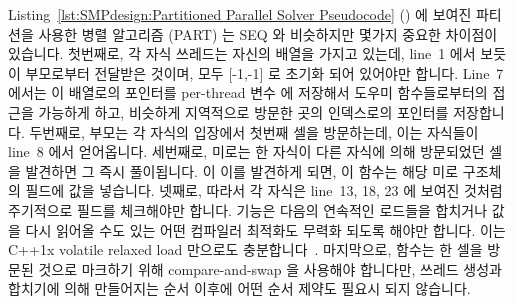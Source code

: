 Listing~\ref{lst:SMPdesign:Partitioned Parallel Solver Pseudocode}
() 에 보여진 파티션을 사용한 병렬 알고리즘 (PART) 는 SEQ 와
비슷하지만 몇가지 중요한 차이점이 있습니다.
첫번째로, 각 자식 쓰레드는 자신의  배열을 가지고 있는데, line~1
에서 보듯이 부모로부터 전달받은 것이며, 모두 [-1,-1] 로 초기화 되어 있어야만
합니다.
Line~7 에서는 이 배열로의 포인터를 per-thread 변수  에 저장해서
도우미 함수들로부터의 접근을 가능하게 하고, 비슷하게 지역적으로 방문한 곳의
인덱스로의 포인터를 저장합니다.
두번째로, 부모는 각 자식의 입장에서 첫번째 셀을 방문하는데, 이는 자식들이
line~8 에서 얻어옵니다.
세번째로, 미로는 한 자식이 다른 자식에 의해 방문되었던 셀을 발견하면 그 즉시
풀이됩니다.
 이 이를 발견하게 되면, 이 함수는 해당 미로 구조체의
 필드에 값을 넣습니다.
넷째로, 따라서 각 자식은 line~13, 18, 23 에 보여진 것처럼 주기적으로
 필드를 체크해야만 합니다.
 기능은 다음의 연속적인 로드들을 합치거나 값을 다시 읽어올
수도 있는 어떤 컴파일러 최적화도 무력화 되도록 해야만 합니다.
이는 C++1x volatile relaxed load 만으로도
충분합니다~\cite{PeteBecker2011N3242}.
마지막으로,  함수는 한 셀을 방문된 것으로
마크하기 위해 compare-and-swap 을 사용해야 합니다만, 쓰레드 생성과 합치기에
의해 만들어지는 순서 이후에 어떤 순서 제약도 필요시 되지 않습니다.

